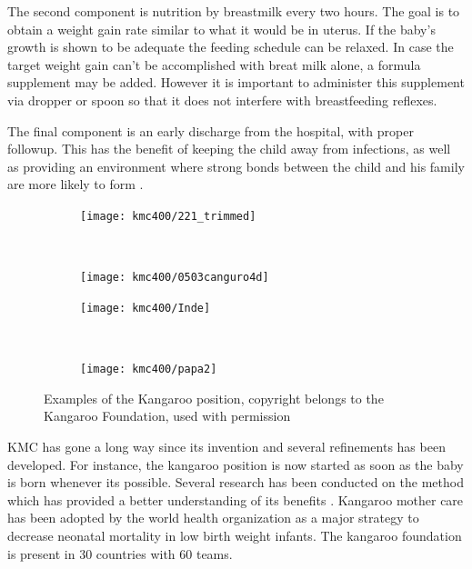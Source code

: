 The second component is nutrition by breastmilk every two hours. The goal is to obtain a weight gain rate similar to what it would be in uterus. If the baby's growth is shown to be adequate the feeding schedule can be relaxed. In case the target weight gain can't be accomplished with breat milk alone, a formula supplement may be added. However it is important to administer this supplement via dropper or spoon so that it does not interfere with breastfeeding reflexes.

The final component is an early discharge from the hospital, with proper followup. This has the benefit of keeping the child away from infections, as well as providing an environment where strong bonds between the child and his family are more likely to form \autocite{charpak_kangaroo_2005}. 

\begin{figure}
    \centering
    \begin{subfigure}{0.45\textwidth}
        \texttt{[image: kmc400/221\_trimmed]}
    \end{subfigure} ~
    \begin{subfigure}{0.45\textwidth}
        \texttt{[image: kmc400/0503canguro4d]}
    \end{subfigure}
		\par \bigskip
		\begin{subfigure}{0.45\textwidth}
        \texttt{[image: kmc400/Inde]}
    \end{subfigure} ~
		    \begin{subfigure}{0.45\textwidth}
        \texttt{[image: kmc400/papa2]}
    \end{subfigure}
    \caption{Examples of the Kangaroo position, copyright belongs to the Kangaroo Foundation, used with permission}\label{fig_kmc_position}
\end{figure}

KMC has gone a long way since its invention \autocite{charpak_kmc_2011} and several refinements has been developed. For instance, the kangaroo position is now started as soon as the baby is born whenever its possible. Several research has been conducted on the method which has provided a better understanding of its benefits \autocite{the_cochrane_collaboration_kangaroo_2014}.
Kangaroo mother care has been adopted by the world health organization as a major strategy to decrease neonatal mortality in low birth weight infants. The kangaroo foundation is present in 30 countries with 60 teams. 



